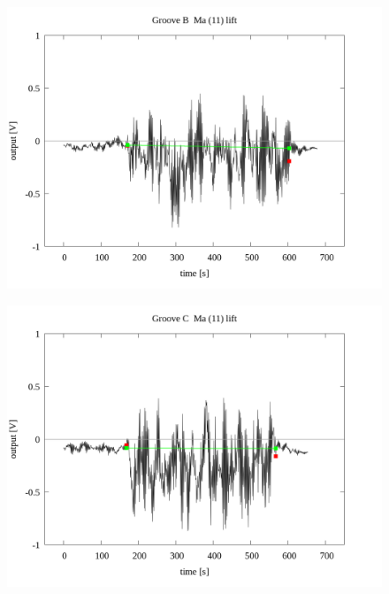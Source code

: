 \documentclass[a4paper]{jsarticle}
\begin{document}
\begin{figure}[htbp]
    \footnotesize
    \begin{center}
        \includegraphics[width=140mm]{../../../../33_result/210806/moving_average/11/lift/03/Groove_B_ma(11)_lift_03.png}
    \end{center}
\end{figure}

\begin{figure}[htbp]
    \footnotesize
    \begin{center}
        \includegraphics[width=140mm]{../../../../33_result/210806/moving_average/11/lift/03/Groove_C_ma(11)_lift_03.png}
    \end{center}
\end{figure}
\end{document}
